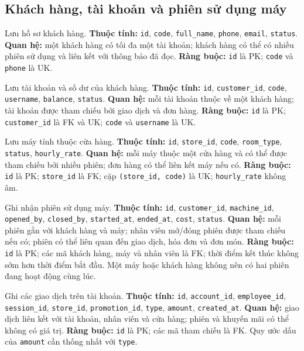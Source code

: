 \subsection{Khách hàng, tài khoản và phiên sử dụng máy}
\begin{description}[leftmargin=3.7cm,labelwidth=3.5cm,style=nextline]
  \item[\texttt{customers}] Lưu hồ sơ khách hàng. \textbf{Thuộc tính:} \texttt{id}, \texttt{code}, \texttt{full\_name}, \texttt{phone}, \texttt{email}, \texttt{status}. \textbf{Quan hệ:} một khách hàng có tối đa một tài khoản; khách hàng có thể có nhiều phiên sử dụng và liên kết với thông báo đã đọc. \textbf{Ràng buộc:} \texttt{id} là PK; \texttt{code} và \texttt{phone} là UK.
  \item[\texttt{accounts}] Lưu tài khoản và số dư của khách hàng. \textbf{Thuộc tính:} \texttt{id}, \texttt{customer\_id}, \texttt{code}, \texttt{username}, \texttt{balance}, \texttt{status}. \textbf{Quan hệ:} mỗi tài khoản thuộc về một khách hàng; tài khoản được tham chiếu bởi giao dịch và đơn hàng. \textbf{Ràng buộc:} \texttt{id} là PK; \texttt{customer\_id} là FK và UK; \texttt{code} và \texttt{username} là UK.
  \item[\texttt{machines}] Lưu máy tính thuộc cửa hàng. \textbf{Thuộc tính:} \texttt{id}, \texttt{store\_id}, \texttt{code}, \texttt{room\_type}, \texttt{status}, \texttt{hourly\_rate}. \textbf{Quan hệ:} mỗi máy thuộc một cửa hàng và có thể được tham chiếu bởi nhiều phiên; đơn hàng có thể liên kết máy nếu có. \textbf{Ràng buộc:} \texttt{id} là PK; \texttt{store\_id} là FK; cặp \texttt{(store\_id, code)} là UK; \texttt{hourly\_rate} không âm.
  \item[\texttt{usage\_sessions}] Ghi nhận phiên sử dụng máy. \textbf{Thuộc tính:} \texttt{id}, \texttt{customer\_id}, \texttt{machine\_id}, \texttt{opened\_by}, \texttt{closed\_by}, \texttt{started\_at}, \texttt{ended\_at}, \texttt{cost}, \texttt{status}. \textbf{Quan hệ:} mỗi phiên gắn với khách hàng và máy; nhân viên mở/đóng phiên được tham chiếu nếu có; phiên có thể liên quan đến giao dịch, hóa đơn và đơn món. \textbf{Ràng buộc:} \texttt{id} là PK; các mã khách hàng, máy và nhân viên là FK; thời điểm kết thúc không sớm hơn thời điểm bắt đầu. Một máy hoặc khách hàng không nên có hai phiên đang hoạt động cùng lúc.
  \item[\texttt{account\_transactions}] Ghi các giao dịch trên tài khoản. \textbf{Thuộc tính:} \texttt{id}, \texttt{account\_id}, \texttt{employee\_id}, \texttt{session\_id}, \texttt{store\_id}, \texttt{promotion\_id}, \texttt{type}, \texttt{amount}, \texttt{created\_at}. \textbf{Quan hệ:} giao dịch liên kết với tài khoản, nhân viên và cửa hàng; phiên và khuyến mãi có thể không có giá trị. \textbf{Ràng buộc:} \texttt{id} là PK; các mã tham chiếu là FK. Quy ước dấu của \texttt{amount} cần thống nhất với \texttt{type}.

\end{description}
